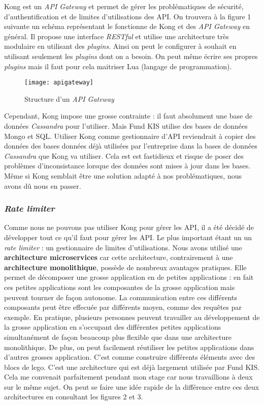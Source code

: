 \vspace{3mm}

Kong est un \textit{API Gateway} et permet de gérer les problématiques de sécurité, d'authentification et de limites d'utilisations des API. On trouvera à la figure 1 suivante un schéma représentant le fonctionne de Kong et des \textit{API Gateway} en général. Il propose une interface \textit{RESTful} et utilise une architecture très modulaire en utilisant des \textit{plugins}. Ainsi on peut le configurer à souhait en utilisant seulement les \textit{plugins} dont on a besoin. On peut même écrire ses propres \textit{plugins} mais il faut pour cela maitriser Lua (langage de programmation).

\begin{figure}[!h]
\centering
\texttt{[image: apigateway]}
\caption{Structure d'un \textit{API Gateway}}
\end{figure}

\vspace{3mm}

Cependant, Kong impose une grosse contrainte : il faut absolument une base de données \textit{Cassandra} pour l'utiliser. Mais Fund KIS utilise des bases de données Mongo et SQL. Utiliser Kong comme gestionnaire d'API reviendrait à copier des données des bases données déjà utilisées par l'entreprise dans la bases de données \textit{Cassandra} que Kong va utiliser. Cela est est fastidieux et risque de poser des problèmes d'inconsistance lorsque des données sont mises à jour dans les bases. Même si Kong semblait être une solution adapté à nos problématiques, nous avons dû nous en passer.



\subsubsection{\textit{Rate limiter}}
Comme nous ne pouvons pas utiliser Kong pour gérer les API, il a été décidé de développer tout ce qu'il faut pour gérer les API. Le plus important étant un un \textit{rate limiter} : un gestionnaire de limites d'utilisations. Nous avons utilisé une \textbf{architecture microservices} car cette architecture, contrairement à une \textbf{architecture monolithique}, possède de nombreux avantages pratiques. Elle permet de décomposer une grosse application en de petites applications : en fait ces petites applications sont les composantes de la grosse application mais peuvent tourner de façon autonome. La communication entre ces différents composants peut être effecuée par différents moyen, comme des requêtes par exemple. En pratique, plusieurs personnes peuvent travailler au développement de la grosse application en s'occupant des différentes petites applications simultanément de façon beaucoup plus flexible que dans une architecture monolithique. De plus, on peut facilement réutiliser les petites applications dans d'autres grosses application. C'est comme construire différents éléments avec des blocs de lego. C'est une architecture qui est déjà largement utilisée par Fund KIS. Cela me convenait parfaitement pendant mon stage car nous travaillions à deux sur le même sujet. On peut se faire une idée rapide de la différence entre ces deux architectures en consultant les figures 2 et 3.

